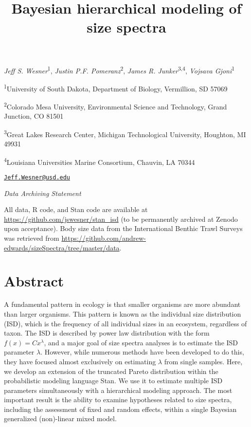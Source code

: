 \documentclass[
  12pt,
]{article}
\title{Bayesian hierarchical modeling of size spectra}
\author{}
\date{\vspace{-2.5em}}
\begin{document}
\maketitle

\emph{Jeff S. Wesner}\textsuperscript{1}, \emph{Justin P.F.
Pomeranz}\textsuperscript{2}, \emph{James R.
Junker}\textsuperscript{3,4}, \emph{Vojsava Gjoni}\textsuperscript{1}

\textsuperscript{1}University of South Dakota, Department of Biology,
Vermillion, SD 57069

\textsuperscript{2}Colorado Mesa University, Environmental Science and
Technology, Grand Junction, CO 81501

\textsuperscript{3}Great Lakes Research Center, Michigan Technological
University, Houghton, MI 49931

\textsuperscript{4}Louisiana Universities Marine Consortium, Chauvin, LA
70344

\href{mailto:Jeff.Wesner@usd.edu}{\nolinkurl{Jeff.Wesner@usd.edu}}

\emph{Data Archiving Statement}

All data, R code, and Stan code are available at
\url{https://github.com/jswesner/stan_isd} (to be permanently archived
at Zenodo upon acceptance). Body size data from the International
Benthic Trawl Surveys was retrieved from
\url{https://github.com/andrew-edwards/sizeSpectra/tree/master/data}.

\newpage

\hypertarget{abstract}{%
\section{Abstract}\label{abstract}}

A fundamental pattern in ecology is that smaller organisms are more
abundant than larger organisms. This pattern is known as the individual
size distribution (ISD), which is the frequency of all individual sizes
in an ecosystem, regardless of taxon. The ISD is described by power law
distribution with the form \(f(x) = Cx^{\lambda}\), and a major goal of
size spectra analyses is to estimate the ISD parameter \(\lambda\).
However, while numerous methods have been developed to do this, they
have focused almost exclusively on estimating \(\lambda\) from single
samples. Here, we develop an extension of the truncated Pareto
distribution within the probabilistic modeling language Stan. We use it
to estimate multiple ISD parameters simultaneously with a hierarchical
modeling approach. The most important result is the ability to examine
hypotheses related to size spectra, including the assessment of fixed
and random effects, within a single Bayesian generalized (non)-linear
mixed model.
\end{document}
